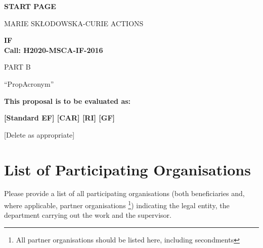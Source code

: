 
\phantom{a}
\vspace{15mm}
\begin{center}


        \Large{
      
     
        \textbf{START PAGE}
  
          \vspace{15mm}
          MARIE SK\L{}ODOWSKA-CURIE ACTIONS\\
          \vspace{1cm}
          
          \textbf{\acf{IF}}\\
          \textbf{Call: H2020-MSCA-IF-2016}
          \vspace{2cm}                   

          PART B
          \vspace{2.5cm}

          ``{\sc \ac{PropAcronym}\xspace}''
          \vspace{2cm}

          \textbf{This proposal is to be evaluated as:}
          \vspace{.5cm}

          \textbf{[Standard EF] [CAR] [RI] [GF]}\\
        }
        \large{[Delete as appropriate]}

  \end{center}
\vspace{1cm}

\newpage
{}
\setcounter{tocdepth}{1}
\tableofcontents
{}


\newpage
{}
\section*{List of Participating Organisations}
\label{sec:participants}

Please provide a list of all participating organisations (both beneficiaries and, where applicable, partner organisations%
\footnote{All partner organisations should be listed here, including secondments}) 
indicating the legal entity, the department carrying out the work and the supervisor.


